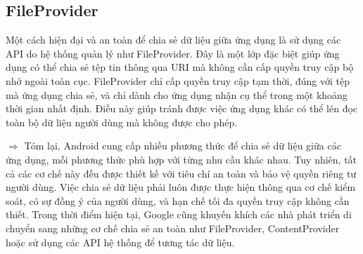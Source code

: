 \subsection{FileProvider}
\renewcommand{\labelitemi}{--}    
    \begin{flushleft}
        \hspace*{0.8cm}Một cách hiện đại và an toàn để chia sẻ dữ liệu giữa ứng dụng là sử dụng các API do hệ thống quản lý như FileProvider. Đây là một lớp đặc biệt giúp ứng dụng có thể chia sẻ tệp tin thông qua URI mà không cần cấp quyền truy cập bộ nhớ ngoài toàn cục. FileProvider chỉ cấp quyền truy cập tạm thời, đúng với tệp mà ứng dụng chia sẻ, và chỉ dành cho ứng dụng nhận cụ thể trong một khoảng thời gian nhất định. Điều này giúp tránh được việc ứng dụng khác có thể lén đọc toàn bộ dữ liệu người dùng mà không được cho phép.
    \end{flushleft}
    \begin{flushleft}
      \hspace*{0.8cm}$\Rightarrow$ Tóm lại, Android cung cấp nhiều phương thức để chia sẻ dữ liệu giữa các ứng dụng, mỗi phương thức phù hợp với từng nhu cầu khác nhau. Tuy nhiên, tất cả các cơ chế này đều được thiết kế với tiêu chí an toàn và bảo vệ quyền riêng tư người dùng. Việc chia sẻ dữ liệu phải luôn được thực hiện thông qua cơ chế kiểm soát, có sự đồng ý của người dùng, và hạn chế tối đa quyền truy cập không cần thiết. Trong thời điểm hiện tại, Google cũng khuyến khích các nhà phát triển di chuyển sang những cơ chế chia sẻ an toàn như FileProvider, ContentProvider hoặc sử dụng các API hệ thống để tương tác dữ liệu.
    \end{flushleft}

